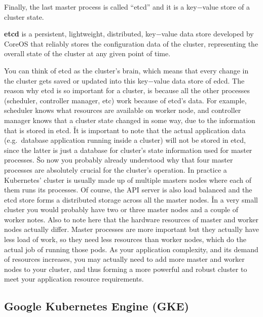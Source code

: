 Finally, the last master process is called ``etcd'' and it is a key$-$value store of a cluster state.

\bd[etcd]
\textbf{etcd} is a persistent, lightweight, distributed, key$-$value data store developed by CoreOS that reliably
stores the configuration data of the cluster, representing the overall state of the cluster at any given point of
time.
\ed


You can think of etcd as the cluster's brain, which means that every change in the cluster gets saved or updated into
this key$-$value data store of edcd. The reason why etcd is so important for a cluster, is because all the other
processes (scheduler, controller manager, etc) work because of etcd's data. For example, scheduler knows what
resources are available on worker node, and controller manager knows that a cluster state changed in some way, due to
the information that is stored in etcd. \v

It is important to note that the actual application data (e.g.\ database application running inside a cluster) will not
be stored in etcd, since the latter is just a database for cluster's state information used for master processes. \v

So now you probably already understood why that four master processes are absolutely crucial for the cluster's
operation. In practice a Kubernetes' cluster is usually made up of multiple masters nodes where each of them runs its
processes. Of course, the API server is also load balanced and the etcd store forms a distributed storage across all
the master nodes. \v

In a very small cluster you would probably have two or three master nodes and a couple of worker notes. Also to note
here that the hardware resources of master and worker nodes actually differ. Master processes are more important but
they actually have less load of work, so they need less resources than worker nodes, which do the actual job of
running those pods. As your application complexity, and its demand of resources increases, you may actually need to
add more master and worker nodes to your cluster, and thus forming a more powerful and robust cluster to meet your
application resource requirements.


\subsection{Google Kubernetes Engine (GKE)}

